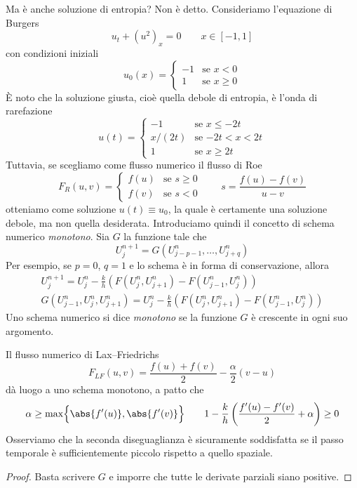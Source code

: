 \noindent Ma è anche soluzione di entropia? Non è detto.
Consideriamo l'equazione di Burgers
\[
u_t + (u^2)_x = 0
\qquad x \in [-1,1]
\]
con condizioni iniziali
\[
u_0(x) = \begin{cases}
-1 & \text{se $x < 0$} \\
 1 & \text{se $x \geq 0$}
\end{cases}
\]
È noto che la soluzione giusta, cioè quella debole di entropia,
è l'onda di rarefazione
\[
u(t) = \begin{cases}
-1 & \text{se $x \leq -2t$} \\
x/(2t) & \text{se $-2t < x < 2t$} \\
 1 & \text{se $x \geq 2t$}
\end{cases}
\]
Tuttavia, se scegliamo come flusso numerico il flusso di Roe
\[
F_R(u,v) = \begin{cases}
f(u) & \text{se $s \geq 0$} \\
f(v) & \text{se $s < 0$}
\end{cases}
\qquad s = \frac{f(u)-f(v)}{u-v}
\]
otteniamo come soluzione $u(t) \equiv u_0$, la quale è certamente
una soluzione debole, ma non quella desiderata.
Introduciamo quindi il concetto di schema numerico \emph{monotono}.
Sia $G$ la funzione tale che
\[
U_j^{n+1} = G(U_{j-p-1}^n, \dots, U_{j+q}^n)
\]
Per esempio, se $p = 0$, $q = 1$ e lo schema è in forma di conservazione,
allora
\begin{gather*}
U_j^{n+1}
= U_j^n - \frac{k}{h} (F(U_j^n, U_{j+1}^n) - F(U_{j-1}^n, U_j^n)) \\
G(U_{j-1}^n,U_j^n,U_{j+1}^n)
= U_j^n - \frac{k}{h} (F(U_j^n, U_{j+1}^n) - F(U_{j-1}^n, U_j^n))
\end{gather*}
Uno schema numerico si dice \emph{monotono} se la funzione $G$
è crescente in ogni suo argomento.

\begin{teor}
Il flusso numerico di Lax–Friedrichs
\[
F_{LF}(u,v) = \frac{f(u)+f(v)}{2} - \frac{\alpha}{2} (v-u)
\]
dà luogo a uno schema monotono, a patto che
\[
\alpha \geq \max \Bigl\{ \abs{f'(u)},\abs{f'(v)} \Bigr\}
\qquad 1 - \frac{k}{h} \left( \frac{f'(u)-f'(v)}{2} + \alpha \right) \geq 0
\]
Osserviamo che la seconda diseguaglianza è sicuramente soddisfatta
se il passo temporale è sufficientemente piccolo rispetto a quello spaziale.
\end{teor}

\begin{proof}
Basta scrivere $G$ e imporre che tutte le derivate parziali siano positive.
\end{proof}

